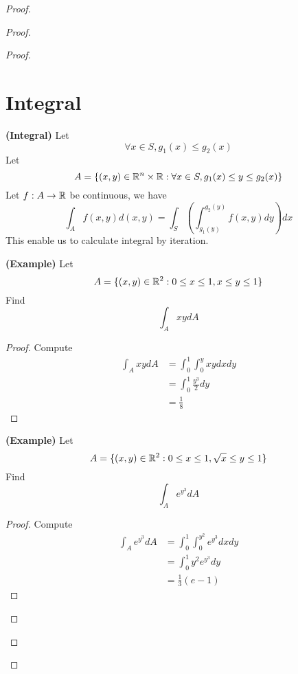 \documentclass{report}
\begin{document}
\begin{proof}
\begin{proof}
\begin{proof}
\section{Integral}
\begin{theorem}
\label{6.6.1}
\textbf{(Integral)} Let 
 \begin{equation}
\forall x \in S, g_1(x)\leq g_2(x)
\end{equation}
Let  
\begin{equation}
A=\{ (x,y)\in \mathbb{R}^n \times \mathbb{R}: \forall x \in S, g_1(x)\leq y\leq g_2(x) \}
\end{equation}
Let $f:A \rightarrow \mathbb{R}$ be continuous, we have
\begin{equation}
\int_A f(x,y)d(x,y)=\int_S(\int_{g_1(y)}^{g_2(y)} f(x,y)dy)dx
\end{equation}
This enable us to calculate integral by iteration.  
\end{theorem}
\begin{theorem}
\label{6.6.2}
\textbf{(Example)} Let 
\begin{equation}
A=\{ (x,y)\in\mathbb{R}^2 : 0\leq x\leq 1, x\leq y\leq 1 \}
\end{equation}
Find
\begin{equation}
\int_A xydA
\end{equation}
\end{theorem}
\begin{proof}
Compute
\begin{align}
  \int_A xydA&=\int_0^1\int_0^y xy dxdy\\
  &=\int_0^1 \frac{y^3}{2}dy\\
  &=\frac{1}{8}
\end{align}
\end{proof}
\begin{theorem}
\label{6.6.3}
\textbf{(Example)} Let 
\begin{equation}
A=\{ (x,y)\in\mathbb{R}^2 :0\leq x\leq 1, \sqrt{x} \leq y\leq 1 \}
\end{equation}
Find 
\begin{equation}
\int_A e^{y^3}dA
\end{equation}
\end{theorem}
\begin{proof}
Compute
\begin{align}
  \int_A e^{y^3}dA&=\int^1_0\int^{y^2}_0 e^{y^3}dxdy\\
&=\int_0^1 y^2e^{y^3}dy\\
&=\frac{1}{3}(e-1)
\end{align}
\end{proof}

\end{proof}
\end{proof}
\end{proof}
\end{document}
